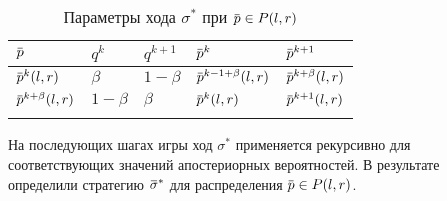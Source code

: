 {\begin{table}[htb]
  \centering
  \renewcommand{\arraystretch}{1.5}
  \captionsetup{width=17cm}
  \caption{Параметры хода $\sigma^*$ при $\p \in P(l, r)$}
  \label{ch2:tab:insider-strategy}
  \begin{tabular}{|P{3cm}||P{3cm}|P{3cm}|P{3cm}|P{3cm}|}
    \hline
    \hline
    $\p$                 & $q^k$     & $q^{k+1}$ & $\p^{k}$               & $\p^{k+1}$           \\ \hline
    $\p^k(l, r)$         & $\beta$   & $1-\beta$ & $\p^{k-1+\beta}(l, r)$ & $\p^{k+\beta}(l, r)$ \\ \hline
    $\p^{k+\beta}(l, r)$ & $1-\beta$ & $\beta$   & $\p^k(l, r)$           & $\p^{k+1}(l, r)$     \\
    \hline
    \hline
    \vspace{-2.5em}
  \end{tabular}
\end{table}

На последующих шагах игры ход $\sigma^*$ применяется рекурсивно для соответствующих значений апостериорных вероятностей.
В результате определили стратегию $\sigmav^*$ для распределения $\p \in P(l,r)$.

}
